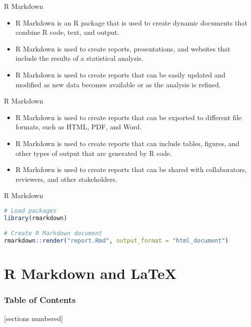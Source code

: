 \documentclass[serif, 9pt, aspectratio=32]{beamer}
\begin{document}
\begin{frame}{R Markdown}
    \begin{itemize}
        \setlength{\itemsep}{2em}
        \item R Markdown is an R package that is used to create dynamic documents that combine R code, text, and output.
        \item R Markdown is used to create reports, presentations, and websites that include the results of a statistical analysis.
        \item R Markdown is used to create reports that can be easily updated and modified as new data becomes available or as the analysis is refined.
    \end{itemize}
\end{frame}

\begin{frame}{R Markdown}
    \begin{itemize}
        \setlength{\itemsep}{2em}
        \item R Markdown is used to create reports that can be exported to different file formats, such as HTML, PDF, and Word.
        \item R Markdown is used to create reports that can include tables, figures, and other types of output that are generated by R code.
        \item R Markdown is used to create reports that can be shared with collaborators, reviewers, and other stakeholders.
    \end{itemize}
\end{frame}

\begin{frame}[fragile]{R Markdown}
    \begin{lstlisting}[language=R]
# Load packages
library(rmarkdown)

# Create R Markdown document
rmarkdown::render("report.Rmd", output_format = "html_document")
    \end{lstlisting}
\end{frame}

\section{R Markdown and LaTeX}

\begin{frame}
    \frametitle{Table of Contents}
    [sections numbered]
    \tableofcontents[currentsection]
\end{frame}
\end{document}
